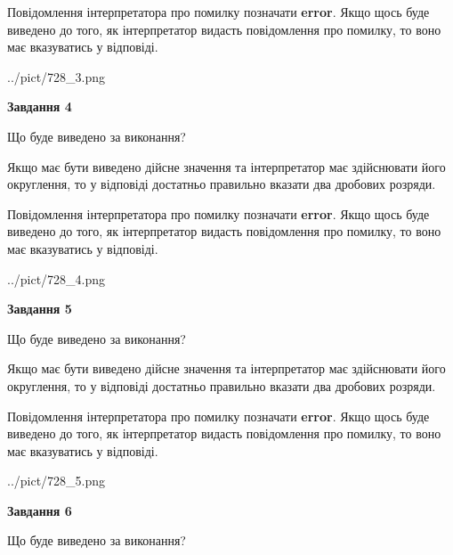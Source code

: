 \documentclass[12pt, ukrainian]{article}
\begin{document}
{\begin {Large}
Повідомлення інтерпретатора про помилку позначати \textbf{error}.
Якщо щось буде виведено до того, як інтерпретатор видасть повідомлення про помилку, 
то воно має вказуватись у відповіді. \par

\begin{center}
	{../pict/728_3.png}
\end{center}
\newpage

{\begin {center}\textbf{Завдання 4}\end {center}}\par
Що буде виведено за виконання? \par

Якщо має бути виведено дійсне значення та інтерпретатор має здійснювати його округлення, 
то у відповіді достатньо правильно вказати два дробових розряди.

Повідомлення інтерпретатора про помилку позначати \textbf{error}.
Якщо щось буде виведено до того, як інтерпретатор видасть повідомлення про помилку, 
то воно має вказуватись у відповіді. \par

\begin{center}
	{../pict/728_4.png}
\end{center}
\newpage

{\begin {center}\textbf{Завдання 5}\end {center}}\par
Що буде виведено за виконання? \par

Якщо має бути виведено дійсне значення та інтерпретатор має здійснювати його округлення, 
то у відповіді достатньо правильно вказати два дробових розряди.

Повідомлення інтерпретатора про помилку позначати \textbf{error}.
Якщо щось буде виведено до того, як інтерпретатор видасть повідомлення про помилку, 
то воно має вказуватись у відповіді. \par

\begin{center}
	{../pict/728_5.png}
\end{center}
\newpage

{\begin {center}\textbf{Завдання 6}\end {center}}\par
Що буде виведено за виконання? \par


\end{Large}}
\end{document}
